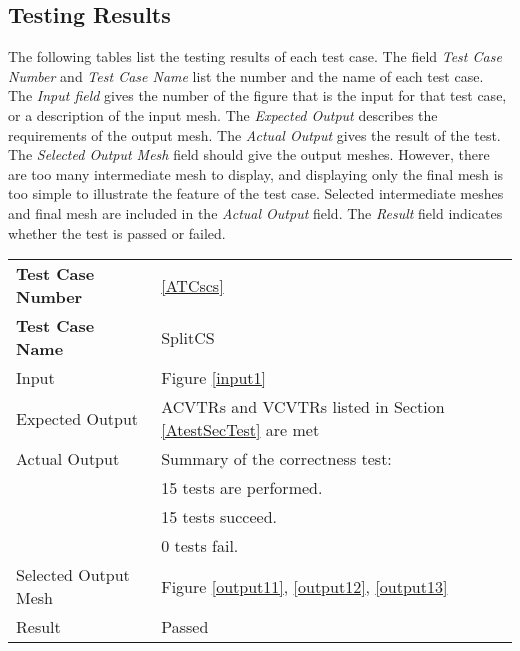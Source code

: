 \documentclass[12pt,titlepage]{article}
\begin{document}
\subsection {Testing Results \label{AtestSectestresult}}
The following tables list the testing results of each test case. The field {\em Test Case Number} and {\em Test Case Name} list the number and the name of each test case. The {\em Input field} gives the number of the figure that is the input for that test case, or a description of the input mesh. The {\em Expected Output} describes the requirements of the output mesh. The {\em Actual Output} gives the result of the test. The {\em Selected Output Mesh} field should give the output meshes. However, there are too many intermediate mesh to display, and displaying only the final mesh is too simple to illustrate the feature of the test case. Selected intermediate meshes and final mesh are included in the {\em Actual Output} field. The {\em Result} field indicates whether the test is passed or failed.

\vspace{1cm}
\begin{minipage}{\textwidth}
\begin{tabular}{p{\colAwidth}|p{\colBwidth}} 
\hline \hline 
{\bf Test Case Number} & \cref{ATCscs} \\ 
{\bf Test Case Name} & SplitCS\\ 
\hline
Input & Figure \ref{input1}\\
Expected Output & ACVTRs and VCVTRs listed in Section \ref{AtestSecTest} are met\\
Actual Output & Summary of the correctness test:\\
& 15 tests are performed.\\
& 15 tests succeed.\\
& 0 tests fail.\\
Selected Output Mesh &Figure \ref{output11}, \ref{output12}, \ref{output13}\\
Result & Passed\\
\hline \hline
\end{tabular}
\end{minipage}
\end{document}

